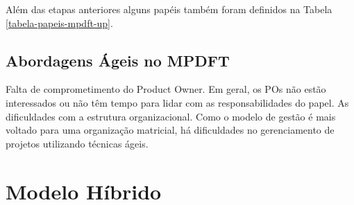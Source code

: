 \documentclass[
	article,			%
	11pt,				%
	oneside,			%
	a4paper,			%
	english,			%
	brazil,				%
	sumario=tradicional
	]{abntex2}
\begin{document}
Além das etapas anteriores alguns papéis também foram definidos na Tabela
\ref{tabela-papeis-mpdft-up}.

\begin{table}[htb]
\end{table}

\subsection{Abordagens Ágeis no MPDFT}

   Falta de comprometimento do Product Owner. Em geral, os POs não estão
   interessados ou não têm tempo para lidar com as responsabilidades do papel.
   As dificuldades com a estrutura organizacional. Como o modelo de gestão é
   mais voltado para uma organização matricial, há dificuldades no
   gerenciamento de projetos utilizando técnicas ágeis.

\section{Modelo Híbrido}
\end{document}
